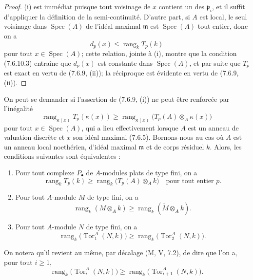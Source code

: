 \begin{proof}
(i) est immédiat puisque tout voisinage de $x$ contient un des $\mathfrak p_i$,
et il suffit d'appliquer la définition de la semi-continuité. D'autre part, si
$A$ est local, le seul voisinage dans $\operatorname{Spec}(A)$ de l'idéal
maximal $\mathfrak m$ est $\operatorname{Spec}(A)$ tout entier, donc on a
\[
  d_p(x)\leq\operatorname{rang}_k T_p(k)
\]
pour tout $x\in\operatorname{Spec}(A)$; cette relation, jointe à (i), montre que
la condition (7.6.10.3) entraîne que $d_p(x)$ est constante dans
$\operatorname{Spec}(A)$, et par suite que $T_p$ est exact en vertu de
(7.6.9, (ii)); la réciproque est évidente en vertu de (7.6.9, (ii)).
\end{proof}

\begin{remark}[7.6.11]
On peut se demander si l'assertion de (7.6.9, (i)) ne peut être renforcée par
l'inégalité
\[
  \operatorname{rang}_{\kappa(x)}T_p(\kappa(x))
  \geq
  \operatorname{rang}_{\kappa(x)}
    \bigl(T_p(A)\otimes_A\kappa(x)\bigr)
  \tag{7.6.11.1}\label{III.7.6.11.1.fr}
\]
pour tout $x\in\operatorname{Spec}(A)$, qui a lieu effectivement lorsque $A$
est un anneau de valuation discrète et $x$ son idéal maximal (7.6.5).
Bornons-nous au cas où $A$ est un anneau local noethérien, d'idéal maximal
$\mathfrak m$ et de corps résiduel $k$. Alors, les conditions suivantes sont
équivalentes :
\begin{enumerate}
  \item[a)] Pour tout complexe $P_\bullet$ de $A$-modules plats de type fini,
    on a
    \[
      \operatorname{rang}_k T_p(k)
      \geq
      \operatorname{rang}_k\bigl(T_p(A)\otimes_A k\bigr)
      \quad\text{pour tout entier }p.
      \tag{7.6.11.2}\label{III.7.6.11.2.fr}
    \]
  \item[b)] Pour tout $A$-module $M$ de type fini, on a
    \[
      \operatorname{rang}_k(M\otimes_A k)
      \geq
      \operatorname{rang}_k(\check M\otimes_A k).
      \tag{7.6.11.3}\label{III.7.6.11.3.fr}
    \]
  \item[c)] Pour tout $A$-module $N$ de type fini, on a
    \[
      \operatorname{rang}_k\bigl(\operatorname{Tor}_1^A(N,k)\bigr)
      \geq
      \operatorname{rang}_k\bigl(\operatorname{Tor}_2^A(N,k)\bigr).
      \tag{7.6.11.4}\label{III.7.6.11.4.fr}
    \]
\end{enumerate}
On notera qu'il revient au même, par décalage (M, V, 7.2), de dire que l'on a,
pour tout $i\geq1$,
\[
  \operatorname{rang}_k\bigl(\operatorname{Tor}_i^A(N,k)\bigr)
  \geq
  \operatorname{rang}_k\bigl(\operatorname{Tor}_{i+1}^A(N,k)\bigr).
\]
\end{remark}
